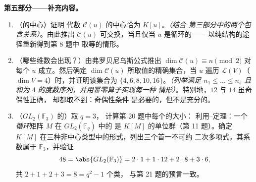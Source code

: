 \begin{problem}
\medskip
\noindent\textbf{第五部分——补充内容。}
\begin{enumerate}[resume]
  \item （的中心）证明
        代数 $\mathcal C(u)$ 的中心恰为 $K[u]$。\emph{（结合
        第三部分中的两个包含关系）}。由此推出
        $\mathcal C(u)$ 可交换，当且仅当 $u$ 是循环的——
        以纯结构的途径重新得到第 8 题中
        取等的情形。
  \item （哪些维数会出现？）由弗罗贝尼乌斯公式推出
        $\dim\mathcal C(u) \equiv n \pmod 2$ 对
        每个 $u$ 成立。然后确定 $\dim \mathcal C(u)$
        所取值的精确集合，当 $u$ 遍历
        $\mathcal L(V)$（$\dim V = 4$）时，并证明该集合为 $\{4, 6,
        8, 10, 16\}$。\emph{（列举满足 $n_1
        \leq \dots \leq n_s$ 且和为 $4$ 的度数序列，并用幂零算子实现每一种
        情形）}。特别地，$12$ 与 $14$ 虽奇偶性正确，
        却都取不到：奇偶性条件
        是必要的，但不是充分的。
  \item （$GL_2(\mathbb F_3)$ 的）取 $q = 3$，
        计算第 20 题中每个的大小：
        利用–定理：一个
        \emph{循环}矩阵 $M$ 在 $GL_2(\mathbb F_q)$ 中的
        是 $K[M]$ 的单位群（第 11 题）。确定
        $K[M]$ 在三种非中心类型中的形式，列出三个首一不可约
        二次多项式，其系数属于 $\mathbb F_3$，并验证
        \[
        48 = \abs{GL_2(\mathbb F_3)}
        = 2\cdot1 + 1\cdot12 + 2\cdot8 + 3\cdot6,
        \]
        共 $2 + 1 + 2 + 3 = 8 = q^2 - 1$ 个类，
        与第 21 题的预言一致。
\end{enumerate}
\end{problem}
